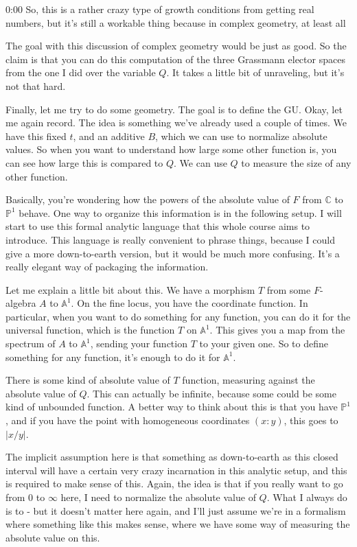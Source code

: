\begin{unfinished}{0:00}
So, this is a rather crazy type of growth conditions from getting real numbers, but it's still a workable thing because in complex geometry, at least all

The goal with this discussion of complex geometry would be just as good. So the claim is that you can do this computation of the three Grassmann elector spaces from the one I did over the variable $Q$. It takes a little bit of unraveling, but it's not that hard.

Finally, let me try to do some geometry. The goal is to define the GU. Okay, let me again record. The idea is something we've already used a couple of times. We have this fixed $t$, and an additive $B$, which we can use to normalize absolute values. So when you want to understand how large some other function is, you can see how large this is compared to $Q$. We can use $Q$ to measure the size of any other function.

Basically, you're wondering how the powers of the absolute value of $F$ from $\mathbb{C}$ to $\mathbb{P}^1$ behave. One way to organize this information is in the following setup. I will start to use this formal analytic language that this whole course aims to introduce. This language is really convenient to phrase things, because I could give a more down-to-earth version, but it would be much more confusing. It's a really elegant way of packaging the information.

Let me explain a little bit about this. We have a morphism $T$ from some $F$-algebra $A$ to $\mathbb{A}^1$. On the fine locus, you have the coordinate function. In particular, when you want to do something for any function, you can do it for the universal function, which is the function $T$ on $\mathbb{A}^1$. This gives you a map from the spectrum of $A$ to $\mathbb{A}^1$, sending your function $T$ to your given one. So to define something for any function, it's enough to do it for $\mathbb{A}^1$.

There is some kind of absolute value of $T$ function, measuring against the absolute value of $Q$. This can actually be infinite, because some could be some kind of unbounded function. A better way to think about this is that you have $\mathbb{P}^1$, and if you have the point with homogeneous coordinates $(x:y)$, this goes to $|x/y|$.

The implicit assumption here is that something as down-to-earth as this closed interval will have a certain very crazy incarnation in this analytic setup, and this is required to make sense of this. Again, the idea is that if you really want to go from 0 to $\infty$ here, I need to normalize the absolute value of $Q$. What I always do is to - but it doesn't matter here again, and I'll just assume we're in a formalism where something like this makes sense, where we have some way of measuring the absolute value on this.


\end{unfinished}
